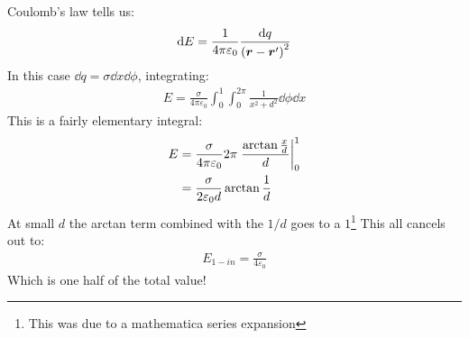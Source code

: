 \documentclass[12pt]{article}
\renewcommand{\vb}[1]{\bm{#1}}
\newcommand{\veps}{\varepsilon}
\begin{document}
Coulomb's law tells us:
\begin{align*}
  \dd{E}=\frac1{4\pi\varepsilon_0}\frac{\dd{q}}{\qty(\vb{r}-\vb{r}')^2}
\end{align*}
In this case $\dd{q}=\sigma\dd{x}\dd{\phi}$, integrating:
\begin{align*}
  E=\frac{\sigma}{4\pi\varepsilon_0}\int_0^1\int_0^{2\pi}
  \frac{1}{x^2+d^2}\dd{\phi}\dd{x}
\end{align*}
This is a fairly elementary integral:
\begin{align*}
  E&=\frac{\sigma}{4\pi\veps_0}2\pi\eval{\frac{\arctan\frac{x}{d}}{d}}_0^1\\
  &=\frac{\sigma}{2\veps_0d}\arctan\frac1d
\end{align*}
At small $d$ the arctan term combined with the $1/d$ goes to a $1$\footnote{This was due to a mathematica series expansion}
This all cancels out to:
\begin{align}
  \boxed{E_{1-in}=\frac{\sigma}{4\veps_0}}
\end{align}
Which is one half of the total value!
\end{document}
